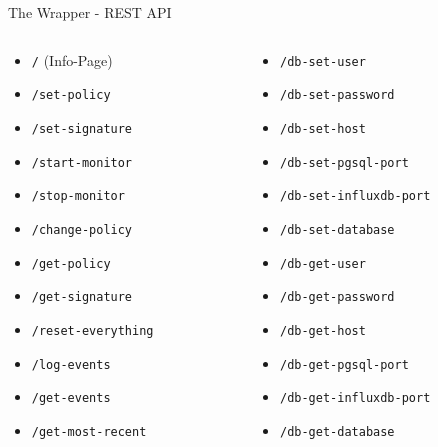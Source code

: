 \begin{frame}[fragile]{The Wrapper - REST API}
    \begin{columns}
        \begin{column}{0.5\textwidth}
            \begin{itemize}
                \item \texttt{/} (Info-Page)
                \item \texttt{/set-policy}
                \item \texttt{/set-signature}
                \item \texttt{/start-monitor}
                \item \texttt{/stop-monitor}
                \item \texttt{/change-policy}
                \item \texttt{/get-policy} 
                \item \texttt{/get-signature}
                \item \texttt{/reset-everything}
                \item \texttt{/log-events}
                \item \texttt{/get-events}
                \item \texttt{/get-most-recent}
            \end{itemize}
        \end{column}
        \begin{column}{0.5\textwidth}
            \begin{itemize}
                \item \texttt{/db-set-user}
                \item \texttt{/db-set-password}
                \item \texttt{/db-set-host}
                \item \texttt{/db-set-pgsql-port}
                \item \texttt{/db-set-influxdb-port}
                \item \texttt{/db-set-database}
                \item \texttt{/db-get-user}
                \item \texttt{/db-get-password}
                \item \texttt{/db-get-host}
                \item \texttt{/db-get-pgsql-port}
                \item \texttt{/db-get-influxdb-port}
                \item \texttt{/db-get-database}
            \end{itemize}
        \end{column}
    \end{columns}
\end{frame}

